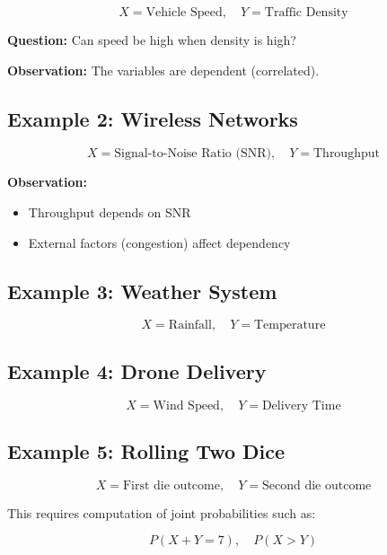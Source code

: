 \documentclass[11pt]{article}
\begin{document}
\[
X = \text{Vehicle Speed}, \quad Y = \text{Traffic Density}
\]

\textbf{Question:} Can speed be high when density is high?

\textbf{Observation:}  
The variables are dependent (correlated).

\vspace{0.2cm}

\subsection{Example 2: Wireless Networks}

\[
X = \text{Signal-to-Noise Ratio (SNR)}, \quad Y = \text{Throughput}
\]

\textbf{Observation:}
\begin{itemize}
    \item Throughput depends on SNR
    \item External factors (congestion) affect dependency
\end{itemize}

\vspace{0.2cm}

\subsection{Example 3: Weather System}

\[
X = \text{Rainfall}, \quad Y = \text{Temperature}
\]

\vspace{0.2cm}

\subsection{Example 4: Drone Delivery}

\[
X = \text{Wind Speed}, \quad Y = \text{Delivery Time}
\]

\vspace{0.2cm}

\subsection{Example 5: Rolling Two Dice}

\[
X = \text{First die outcome}, \quad Y = \text{Second die outcome}
\]

This requires computation of joint probabilities such as:

\[
P(X + Y = 7), \quad P(X > Y)
\]
\end{document}
